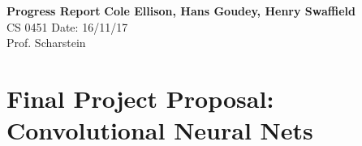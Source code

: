 \documentclass[a4paper, 11pt]{article}
\begin{document}
\noindent
\large\textbf{Progress Report} \hfill \textbf{Cole Ellison, Hans Goudey, Henry Swaffield} \\
\normalsize CS 0451 \hfill Date: 16/11/17\\
Prof. Scharstein \hfill \\

\section*{Final Project Proposal: Convolutional Neural Nets}

\end{document}
